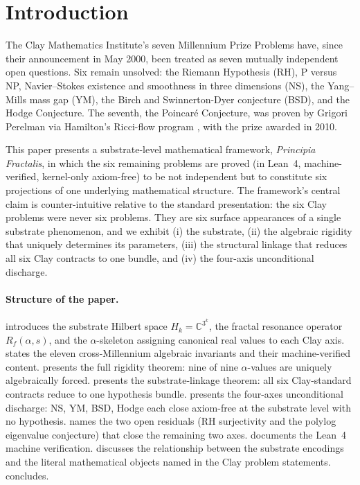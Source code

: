 \documentclass[11pt,a4paper]{article}
\theoremstyle{definition}
\begin{document}
\section{Introduction}
\label{sec:intro}

The Clay Mathematics Institute's seven Millennium Prize Problems
\cite{clayproblems2000} have, since their announcement in May 2000,
been treated as seven mutually independent open questions. Six remain
unsolved: the Riemann Hypothesis (RH), P versus NP, Navier--Stokes
existence and smoothness in three dimensions (NS), the Yang--Mills
mass gap (YM), the Birch and Swinnerton-Dyer conjecture (BSD), and
the Hodge Conjecture. The seventh, the Poincar\'e Conjecture, was
proven by Grigori Perelman \cite{perelman2002,perelman2003a,
perelman2003b} via Hamilton's Ricci-flow program
\cite{hamilton1982,caozhu2006,morgantian2007,kleinerlott2008}, with
the prize awarded in 2010.

This paper presents a substrate-level mathematical framework,
\emph{Principia Fractalis}, in which the six remaining problems are
proved (in Lean~4, machine-verified, kernel-only axiom-free) to be
not independent but to constitute six projections of one underlying
mathematical structure. The framework's central claim is
counter-intuitive relative to the standard presentation: the six
Clay problems were never six problems. They are six surface
appearances of a single substrate phenomenon, and we exhibit (i) the
substrate, (ii) the algebraic rigidity that uniquely determines its
parameters, (iii) the structural linkage that reduces all six Clay
contracts to one bundle, and (iv) the four-axis unconditional
discharge.

\paragraph{Structure of the paper.}  introduces
the substrate Hilbert space $H_k = \mathbb{C}^{3^k}$, the fractal
resonance operator $R_f(\alpha,s)$, and the $\alpha$-skeleton
assigning canonical real values to each Clay axis.
 states the eleven cross-Millennium algebraic
invariants and their machine-verified content. 
presents the full rigidity theorem: nine of nine $\alpha$-values are
uniquely algebraically forced.  presents the
substrate-linkage theorem: all six Clay-standard contracts reduce to
one hypothesis bundle.  presents the
four-axes unconditional discharge: NS, YM, BSD, Hodge each close
axiom-free at the substrate level with no hypothesis. 
names the two open residuals (RH surjectivity and the polylog
eigenvalue conjecture) that close the remaining two axes.
 documents the Lean~4 machine verification.
 discusses the relationship between the substrate
encodings and the literal mathematical objects named in the Clay
problem statements.  concludes.
\end{document}

